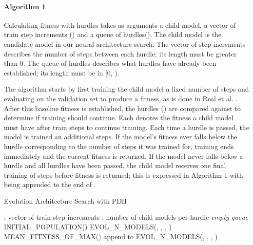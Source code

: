 \documentclass{article}
\begin{document}
\paragraph{Algorithm 1} Calculating fitness with hurdles takes as arguments a child model, a vector of train step increments () and a queue of hurdles(). The child model is the candidate model in our neural architecture search. The vector of step increments describes the number of steps between each hurdle; its length must be greater than 0. The queue of hurdles describes what hurdles have already been established; its length must be in [0, ).

The algorithm starts by first training the child model a fixed number of  steps and evaluating on the validation set to produce a fitness, as is done in Real et al. . After this baseline fitness is established, the hurdles () are compared against to determine if training should continue. Each  denotes the fitness a child model must have after  train steps to continue training. Each time a hurdle  is passed, the model is trained an additional  steps. If the model's fitness ever falls below the hurdle corresponding to the number of steps it was trained for, training ends immediately and the current fitness is returned. If the model never falls below a hurdle and all hurdles have been passed, the child model receives one final training of  steps before fitness is returned; this is expressed in Algorithm 1 with  being appended to the end of .
\vskip 0.2in

\begin{algorithm} [h!]
   \caption{Evolution Architecture Search with PDH}
   \label{algo:2}
\begin{algorithmic}
  \STATE\hspace{3pt} : vector of train step increments
  \STATE\hspace{3pt} : number of child models per hurdle
  \STATE
  \STATE  \textit{empty queue} 
  \STATE 
  \STATE  INITIAL\_POPULATION()
  \STATE
  \STATE  EVOL\_N\_MODELS(,
  \STATE\hspace{150pt}, , )
  \STATE  MEAN\_FITNESS\_OF\_MAX()
  \STATE append  to 
  \ENDWHILE
  \STATE
  \STATE  EVOL\_N\_MODELS(,
  \STATE\hspace{150pt}, , )
\end{algorithmic}
\end{algorithm}
\end{document}
